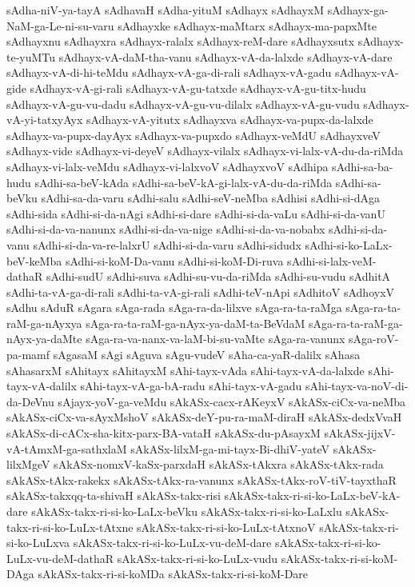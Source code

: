 {sAdha-niV-ya-tayA
sAdhavaH
sAdha-yituM
sAdhayx
sAdhayxM
sAdhayx-ga-NaM-ga-Le-ni-su-varu
sAdhayxke
sAdhayx-maMtarx
sAdhayx-ma-papxMte
sAdhayxnu
sAdhayxra
sAdhayx-ralalx
sAdhayx-reM-dare
sAdhayxsutx
sAdhayx-te-yuMTu
sAdhayx-vA-daM-tha-vanu
sAdhayx-vA-da-lalxde
sAdhayx-vA-dare
sAdhayx-vA-di-hi-teMdu
sAdhayx-vA-ga-di-rali
sAdhayx-vA-gadu
sAdhayx-vA-gide
sAdhayx-vA-gi-rali
sAdhayx-vA-gu-tatxde
sAdhayx-vA-gu-titx-hudu
sAdhayx-vA-gu-vu-dadu
sAdhayx-vA-gu-vu-dilalx
sAdhayx-vA-gu-vudu
sAdhayx-vA-yi-tatxyAyx
sAdhayx-vA-yitutx
sAdhayxva
sAdhayx-va-pupx-da-lalxde
sAdhayx-va-pupx-dayAyx
sAdhayx-va-pupxdo
sAdhayx-veMdU
sAdhayxveV
sAdhayx-vide
sAdhayx-vi-deyeV
sAdhayx-vilalx
sAdhayx-vi-lalx-vA-du-da-riMda
sAdhayx-vi-lalx-veMdu
sAdhayx-vi-lalxvoV
sAdhayxvoV
sAdhipa
sAdhi-sa-ba-hudu
sAdhi-sa-beV-kAda
sAdhi-sa-beV-kA-gi-lalx-vA-du-da-riMda
sAdhi-sa-beVku
sAdhi-sa-da-varu
sAdhi-salu
sAdhi-seV-neMba
sAdhisi
sAdhi-si-dAga
sAdhi-sida
sAdhi-si-da-nAgi
sAdhi-si-dare
sAdhi-si-da-vaLu
sAdhi-si-da-vanU
sAdhi-si-da-va-nanunx
sAdhi-si-da-va-nige
sAdhi-si-da-va-nobabx
sAdhi-si-da-vanu
sAdhi-si-da-va-re-lalxrU
sAdhi-si-da-varu
sAdhi-sidudx
sAdhi-si-ko-LaLx-beV-keMba
sAdhi-si-koM-Da-vanu
sAdhi-si-koM-Di-ruva
sAdhi-si-lalx-veM-dathaR
sAdhi-sudU
sAdhi-suva
sAdhi-su-vu-da-riMda
sAdhi-su-vudu
sAdhitA
sAdhi-ta-vA-ga-di-rali
sAdhi-ta-vA-gi-rali
sAdhi-teV-nApi
sAdhitoV
sAdhoyxV
sAdhu
sAduR
sAgara
sAga-rada
sAga-ra-da-lilxve
sAga-ra-ta-raMga
sAga-ra-ta-raM-ga-nAyxya
sAga-ra-ta-raM-ga-nAyx-ya-daM-ta-BeVdaM
sAga-ra-ta-raM-ga-nAyx-ya-daMte
sAga-ra-va-nanx-va-laM-bi-su-vaMte
sAga-ra-vanunx
sAga-roV-pa-mamf
sAgasaM
sAgi
sAguva
sAgu-vudeV
sAha-ca-yaR-dalilx
sAhasa
sAhasarxM
sAhitayx
sAhitayxM
sAhi-tayx-vAda
sAhi-tayx-vA-da-lalxde
sAhi-tayx-vA-dalilx
sAhi-tayx-vA-ga-bA-radu
sAhi-tayx-vA-gadu
sAhi-tayx-va-noV-di-da-DeVnu
sAjayx-yoV-ga-veMdu
sAkASx-cacx-rAKeyxV
sAkASx-ciCx-va-neMba
sAkASx-ciCx-va-sAyxMshoV
sAkASx-deY-pu-ra-maM-diraH
sAkASx-dedxVvaH
sAkASx-di-cACx-sha-kitx-parx-BA-vataH
sAkASx-du-pAsayxM
sAkASx-jijxV-vA-tAmxM-ga-sathxlaM
sAkASx-lilxM-ga-mi-tayx-Bi-dhiV-yateV
sAkASx-lilxMgeV
sAkASx-nomxV-kaSx-parxdaH
sAkASx-tAkxra
sAkASx-tAkx-rada
sAkASx-tAkx-rakekx
sAkASx-tAkx-ra-vanunx
sAkASx-tAkx-roV-tiV-tayxthaR
sAkASx-takxqq-ta-shivaH
sAkASx-takx-risi
sAkASx-takx-ri-si-ko-LaLx-beV-kA-dare
sAkASx-takx-ri-si-ko-LaLx-beVku
sAkASx-takx-ri-si-ko-LaLxlu
sAkASx-takx-ri-si-ko-LuLx-tAtxne
sAkASx-takx-ri-si-ko-LuLx-tAtxnoV
sAkASx-takx-ri-si-ko-LuLxva
sAkASx-takx-ri-si-ko-LuLx-vu-deM-dare
sAkASx-takx-ri-si-ko-LuLx-vu-deM-dathaR
sAkASx-takx-ri-si-ko-LuLx-vudu
sAkASx-takx-ri-si-koM-DAga
sAkASx-takx-ri-si-koMDa
sAkASx-takx-ri-si-koM-Dare
}
